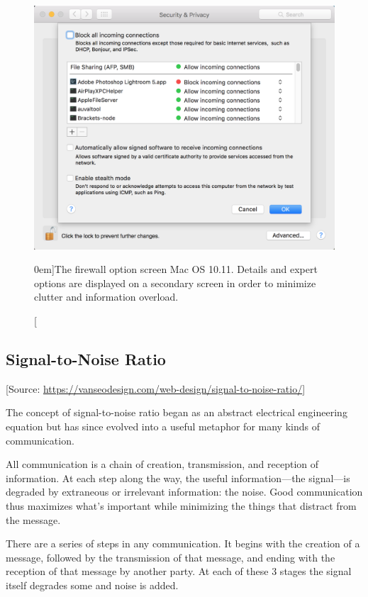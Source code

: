 \begin{figure}%
  \includegraphics[width=1.0\textwidth]{../figures/firewall_details.png}
  \caption[][0em]{The firewall option screen Mac OS 10.11. Details and expert options are displayed on a secondary screen in order to minimize clutter and information overload.}
  \label{fig:firewall_details}
\end{figure}



\subsection{Signal-to-Noise Ratio} %
\label{sub:signal_to_noise_ratio}
[Source: \url{https://vanseodesign.com/web-design/signal-to-noise-ratio/}]


The concept of signal-to-noise ratio began as an abstract electrical engineering equation but has since evolved into a useful metaphor for many kinds of communication.

All communication is a chain of creation, transmission, and reception of information. At each step along the way, the useful information—the signal—is degraded by extraneous or irrelevant information: the noise. Good communication thus maximizes what’s important while minimizing the things that distract from the message.

There are a series of steps in any communication. It begins with the creation of a message, followed by the transmission of that message, and ending with the reception of that message by another party. At each of these 3 stages the signal itself degrades some and noise is added.

